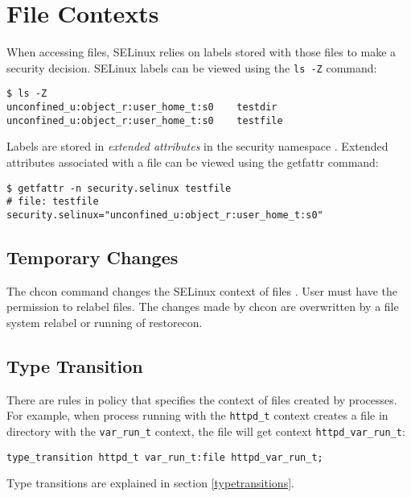 \section{File Contexts}
\label{filecontexts}
When accessing files, SELinux relies on labels stored with those files to make a
security decision. SELinux labels can be viewed using the \texttt{ls -Z}
command:
\begin{lstlisting}
$ ls -Z
unconfined_u:object_r:user_home_t:s0    testdir
unconfined_u:object_r:user_home_t:s0    testfile
\end{lstlisting}
Labels are stored in \emph{extended attributes} in the security namespace
\cite{xattrman}. Extended attributes associated with a file can be viewed using
the getfattr command:
\begin{lstlisting}
$ getfattr -n security.selinux testfile
# file: testfile
security.selinux="unconfined_u:object_r:user_home_t:s0"
\end{lstlisting}

\subsection{Temporary Changes}
The chcon command changes the SELinux context of files \cite{selinuxguide}. User
must have the permission to relabel files. The changes made by chcon are
overwritten by a file system relabel or running of restorecon.

\subsection{Type Transition}
There are rules in policy that specifies the context of files created by
processes. For example, when process running with the \texttt{httpd\_t} context
creates a file in directory with the \texttt{var\_run\_t} context, the file will
get context \texttt{httpd\_var\_run\_t}:
\begin{lstlisting}[language=te]
type_transition httpd_t var_run_t:file httpd_var_run_t;
\end{lstlisting}
Type transitions are explained in section \ref{typetransitions}.

